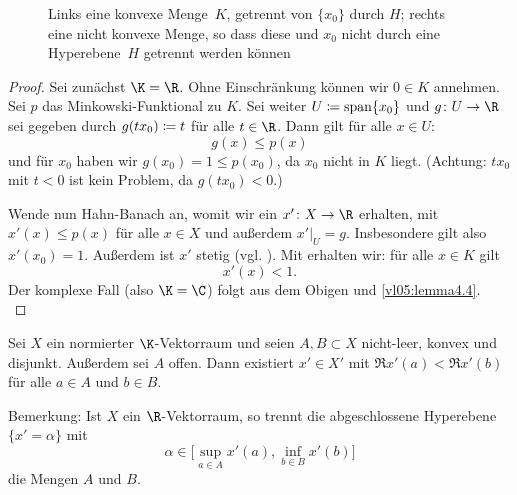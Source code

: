 \begin{thLemma}
\begin{figure}
    \caption{Links eine konvexe Menge~$K$, getrennt von $\{x_0\}$ durch $H$;
             rechts eine nicht konvexe Menge, so dass diese und $x_0$ nicht
             durch eine Hyperebene~$H$ getrennt werden können}
    \label{vl06:fig:convexvsnonconvex}
\end{figure}
\end{thLemma}

\begin{proof}
    Sei zunächst $\K=\R$.  Ohne Einschränkung können wir $0\in K$ annehmen. Sei
    $p$ das Minkowski-Funktional zu $K$. Sei weiter $U\coloneqq\operatorname{span}\{x_0\}$ und
    $g\colon U\to\R$ sei gegeben durch $g(tx_0) \coloneqq t$ für alle $t\in\R$.
    Dann gilt für alle $x\in U$:
    \[ g(x) \leq p(x) \]
    und für $x_0$ haben wir $g(x_0) = 1 \leq p(x_0)$, da $x_0$ nicht in $K$
    liegt. (Achtung: $tx_0$ mit $t<0$ ist kein Problem, da $g(tx_0)<0$.)
    
    Wende nun Hahn-Banach  an, womit wir ein $x'\colon
    X\to\R$ erhalten, mit $x'(x)\leq p(x)$ für alle $x\in X$ und außerdem
    $x'\vert_U = g$. Insbesondere gilt also $x'(x_0)=1$. Außerdem ist
    $x'$ stetig (vgl. ).
    Mit  erhalten wir: für alle $x\in K$
    gilt
    \[ x'(x) < 1  . \]
    Der komplexe Fall (also $\K=\C$) folgt aus dem Obigen und
    \cref{vl05:lemma4.4}.
    \\
\end{proof}

\begin{thSatz}
    \label{vl06:hahnbanachgeom1}
    Sei $X$ ein normierter $\K$-Vektorraum und seien $A,B\subset X$ nicht-leer,
    konvex und disjunkt. Außerdem sei $A$ offen.
    Dann existiert $x'\in X'$ mit $\Re x'(a) < \Re x'(b)$ für alle $a\in A$ und
    $b\in B$.
\end{thSatz}

Bemerkung: Ist $X$ ein $\R$-Vektorraum, so trennt die abgeschlossene Hyperebene
$\{ x'=\alpha \}$ mit 
\[ \alpha\in \bigl[ \sup_{a\in A} x'(a), \inf_{b\in B} x'(b) \bigr] \]
die Mengen $A$ und $B$.

